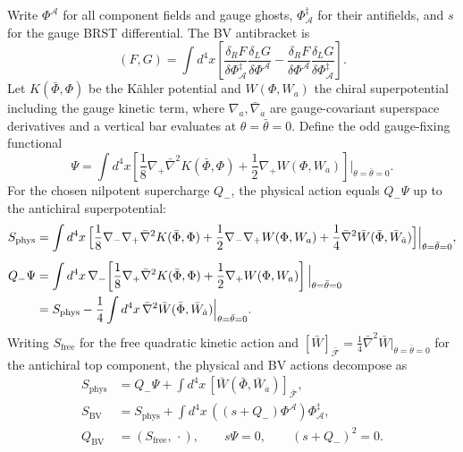 \documentclass[11pt]{article}
\numberwithin{equation}{section}
\numberwithin{figure}{section}
\numberwithin{table}{section}
\begin{document}
Write $\Phi^{\mathcal A}$ for all component fields and gauge ghosts, $\Phi^\ddagger_{\mathcal A}$ for their antifields, and $s$ for the gauge BRST differential. The BV antibracket is
\begin{equation}\label{eq-A-8}
(F,G)=\int d^4x\left[
\frac{\delta_RF}{\delta\Phi^\ddagger_{\mathcal A}}
\frac{\delta_LG}{\delta\Phi^{\mathcal A}}
-\frac{\delta_RF}{\delta\Phi^{\mathcal A}}
\frac{\delta_LG}{\delta\Phi^\ddagger_{\mathcal A}}\right].
\end{equation}
Let $K(\bar\Phi,\Phi)$ be the K\"ahler potential and $W(\Phi,W_a)$ the chiral superpotential including the gauge kinetic term, where $\nabla_a,\bar\nabla_{\dot a}$ are gauge-covariant superspace derivatives and a vertical bar evaluates at $\theta=\bar\theta=0$. Define the odd gauge-fixing functional
\begin{equation}\label{eq-Psi}
\Psi=\int d^4x\left[\frac18\nabla_+\bar\nabla^2K(\bar\Phi,\Phi)
+\frac12\nabla_+W(\Phi,W_a)\right]\Big|_{\theta=\bar\theta=0}.
\end{equation}
For the chosen nilpotent supercharge $Q_-$, the physical action equals $Q_-\Psi$ up to the antichiral superpotential:
\begin{equation*}
\begin{aligned}
S_{\mathrm{phys}}
&=\int d^4x\,\Bigl[
\frac18\nabla_-\nabla_+\bar\nabla^2K(\bar\Phi,\Phi)
+\frac12\nabla_-\nabla_+W(\Phi,W_a)
+\frac14\bar\nabla^2\bar W(\bar\Phi,\bar W_{\dot a})
\Bigr]\Big|_{\theta=\bar\theta=0},\\[4pt]
Q_-\Psi
&=\int d^4x\,\nabla_-\!\left[
\frac18\nabla_+\bar\nabla^2K(\bar\Phi,\Phi)
+\frac12\nabla_+W(\Phi,W_a)
\right]\Big|_{\theta=\bar\theta=0}\\
&=S_{\mathrm{phys}}-\frac14\int d^4x\,
\bar\nabla^2\bar W(\bar\Phi,\bar W_{\dot a})\Big|_{\theta=\bar\theta=0}.
\end{aligned}
\end{equation*}
Writing $S_{\mathrm{free}}$ for the free quadratic kinetic action and $[\bar W]_{\bar{\mathcal F}}=\tfrac14\bar\nabla^2\bar W|_{\theta=\bar\theta=0}$ for the antichiral top component, the physical and BV actions decompose as
\begin{equation}\label{eq-B-1}
\begin{aligned}
S_{\mathrm{phys}}
&=Q_-\Psi+\int d^4x\,[\bar W(\bar\Phi,\bar W_{\dot a})]_{\bar{\mathcal F}},\\
S_{\mathrm{BV}}
&=S_{\mathrm{phys}}+\int d^4x\,((s+Q_-)\Phi^{\mathcal A})\Phi_{\mathcal A}^{\ddagger},\\
Q_{\mathrm{BV}}&=(S_{\mathrm{free}},\,\cdot),\qquad
s\Psi=0,\qquad(s+Q_-)^2=0.
\end{aligned}
\end{equation}
\end{document}
